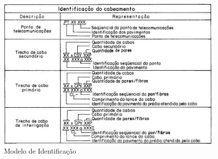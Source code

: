 \begin{figure}[h!]
	\centering
	\includegraphics[width=\textwidth]{fig6}
	\caption{Modelo de Identificação}
	\label{fig6}
\end{figure}
